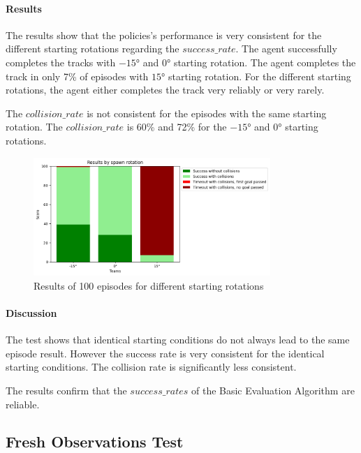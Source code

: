 \paragraph{Results}

The results show that the policies's performance is very consistent for the different starting rotations regarding the $success\_rate$. The agent successfully completes the tracks with $-15°$ and $0°$ starting rotation. The agent completes the track in only 7\% of episodes with $15°$ starting rotation.
For the different starting rotations, the agent either completes the track very reliably or very rarely.

The $collision\_rate$ is not consistent for the episodes with the same starting rotation. The $collision\_rate$ is 60\% and 72\% for the $-15°$ and $0°$ starting rotations. 

\begin{figure}
    \centering
    \includegraphics[width=0.8\textwidth]{Bilder/notebook_images/identicalResults_mixedLightSettings.png}
    \caption{Results of 100 episodes for different starting rotations}
    \label{fig:identical_start_conditions_test_result}
\end{figure}


\paragraph{Discussion}

The test shows that identical starting conditions do not always lead to the same episode result. However the success rate is very consistent for the identical starting conditions. The collision rate is significantly less consistent.

The results confirm that the $success\_rates$ of the Basic Evaluation Algorithm are reliable. 


\subsection{Fresh Observations Test}

